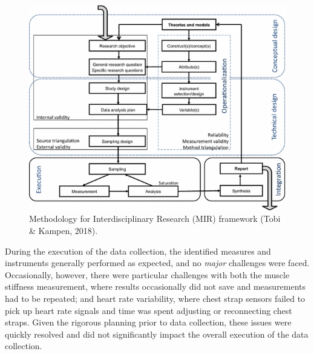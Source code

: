 \documentclass[
  english,
  man,floatsintext]{apa6}
\begin{document}
\begin{figure}

{\centering \includegraphics[width=1\linewidth]{figs/discussion/MIR_framework} 

}

\caption{Methodology for Interdisciplinary Research (MIR) framework (Tobi \& Kampen, 2018).}\label{fig:mir-framework}
\end{figure}

During the execution of the data collection, the identified measures and instruments generally performed as expected, and no \emph{major} challenges were faced.
Occasionally, however, there were particular challenges with both the muscle stiffness measurement, where results occasionally did not save and measurements had to be repeated; and heart rate variability, where chest strap sensors failed to pick up heart rate signals and time was spent adjusting or reconnecting chest straps.
Given the rigorous planning prior to data collection, these issues were quickly resolved and did not significantly impact the overall execution of the data collection.
\end{document}

